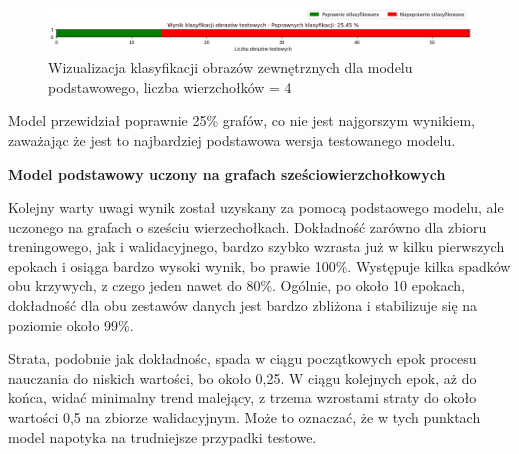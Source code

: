 \begin{figure}[ht]
	\centering
	\includegraphics[width=14cm]{resources/tests/images/v3/base4_bar.png}
	\caption{Wizualizacja klasyfikacji obrazów zewnętrznych dla modelu podstawowego, liczba wierzchołków = 4}
	\label{Fig:tests-base-1c}
\end{figure}
\FloatBarrier

Model przewidział poprawnie 25\% grafów, co nie jest najgorszym wynikiem,
zaważając że jest to najbardziej podstawowa wersja testowanego modelu.




\textbf{Model podstawowy uczony na grafach sześciowierzchołkowych}

Kolejny warty uwagi wynik został uzyskany za pomocą podstaowego modelu, ale uczonego na grafach o sześciu wierzechołkach.
Dokładność zarówno dla zbioru treningowego, jak i walidacyjnego, bardzo szybko wzrasta już w kilku pierwszych epokach
i osiąga bardzo wysoki wynik, bo prawie 100\%.
Występuje kilka spadków obu krzywych, z czego jeden nawet do 80\%.
Ogólnie, po około 10 epokach, dokładność dla obu zestawów danych jest bardzo zbliżona i stabilizuje się na poziomie około 99\%.

Strata, podobnie jak dokładnośc, spada w ciągu początkowych epok procesu nauczania do niskich wartości, bo około 0,25.
W ciągu kolejnych epok, aż do końca, widać minimalny trend malejący, z trzema wzrostami straty do około wartości 0,5 na zbiorze walidacyjnym.
Może to oznaczać, że w tych punktach model napotyka na trudniejsze przypadki testowe.

